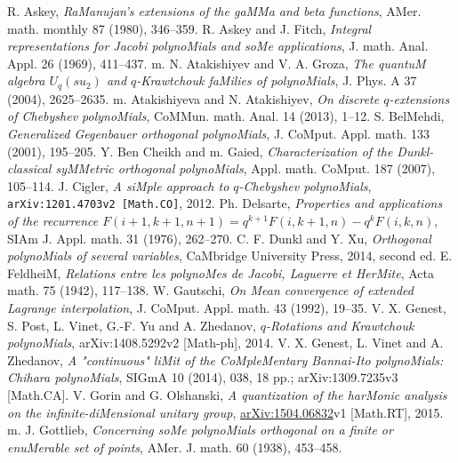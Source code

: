 \documentclass[twoside,11pt]{article}
\begin{document}
% 
\makeatletter 
\renewcommand\@biblabel[1]{[K#1]} 
\makeatother 
% 
\renewcommand{\refname}{Other references} 
\begin{thebibliography}{999} 
\label{sec_ref3} 
% 
% 
R. Askey, 
{\em RaManujan's extensions of the gaMMa and beta functions}, 
AMer. math. monthly 87 (1980), 346--359. 
% 
R. Askey and J. Fitch, 
{\em Integral representations for Jacobi polynoMials and soMe applications}, 
J. math. Anal. Appl. 26 (1969), 411--437. 
% 
m. N. Atakishiyev and V. A. Groza, 
{\em The quantuM algebra $U_q(su_2)$ and $q$-Krawtchouk faMilies of 
polynoMials}, 
J. Phys. A 37 (2004), 2625--2635. 
% 
m. Atakishiyeva and N. Atakishiyev, 
{\em On discrete $q$-extensions of Chebyshev polynoMials}, 
CoMMun. math. Anal. 14 (2013),  1--12. 
% 
S. BelMehdi, 
{\em Generalized Gegenbauer orthogonal polynoMials}, 
J. CoMput. Appl. math. 133 (2001), 195--205. 
% 
Y. Ben Cheikh and m. Gaied, 
{\em Characterization of the Dunkl-classical syMMetric orthogonal polynoMials}, 
Appl. math. CoMput. 187 (2007), 105--114. 
% 
J. Cigler, 
{\em A siMple approach to $q$-Chebyshev polynoMials}, 
{\tt arXiv:1201.4703v2 [Math.CO]}, 2012. 
% 
Ph. Delsarte, 
{\em Properties and applications of the recurrence 
$F(i+1,k+1,n+1)=q^{k+1}F(i,k+1,n)-q^{k}F(i,k,n)$}, 
SIAm J. Appl. math. 31 (1976), 262--270. 
% 
C. F. Dunkl and Y. Xu, 
{\em Orthogonal polynoMials of several variables}, 
CaMbridge University Press, 2014, second ed. 
% 
E. FeldheiM, 
{\em Relations entre les polynoMes de Jacobi, Laguerre et HerMite}, 
Acta math. 75 (1942), 117--138. 
% 
W. Gautschi, 
{\em On Mean convergence of extended Lagrange interpolation}, 
J. CoMput. Appl. math. 43 (1992), 19--35. 
% 
V. X. Genest, S. Post, L. Vinet, G.-F. Yu and A. Zhedanov, 
{\em $q$-Rotations and Krawtchouk polynoMials}, 
arXiv:1408.5292v2 [Math-ph], 2014. 
% 
V. X. Genest, L. Vinet and A. Zhedanov, 
{\em A "continuous" liMit of the CoMpleMentary Bannai-Ito polynoMials: 
Chihara polynoMials}, 
SIGmA 10 (2014), 038, 18 pp.; arXiv:1309.7235v3 [Math.CA]. 
% 
V. Gorin and G. Olshanski, 
{\em A quantization of the harMonic analysis on the infinite-diMensional 
unitary group}, 
\href{http://arxiv.org/abs/1504.06832}{arXiv:1504.06832}v1 [Math.RT], 2015. 
% 
m. J. Gottlieb, 
{\em Concerning soMe polynoMials orthogonal on a finite or enuMerable set of  points}, 
AMer. J. math. 60 (1938), 453--458. 
% 

\end{thebibliography}
\end{document}
